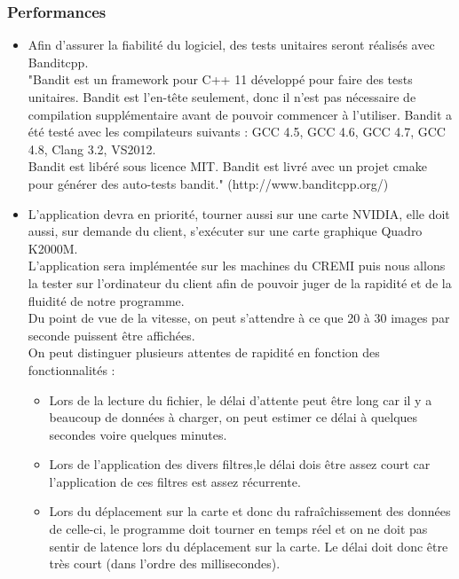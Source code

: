 \documentclass[12pt]{article}
\begin{document}
			\subsubsection{Performances}
				\begin{itemize}
					\item Afin d’assurer la fiabilité du logiciel, des tests unitaires seront réalisés avec Banditcpp.\\
						"Bandit est un framework pour C++ 11 développé pour faire des tests unitaires. Bandit est l’en-tête seulement, donc il n’est pas nécessaire de compilation supplémentaire avant de pouvoir commencer à l’utiliser. Bandit a été testé avec les compilateurs suivants : GCC 4.5, GCC 4.6, GCC 4.7, GCC 4.8, Clang 3.2, VS2012.\\
						Bandit est libéré sous licence MIT. Bandit est livré avec un projet cmake pour générer des auto-tests bandit." (http://www.banditcpp.org/)\\

					\item L'application devra en priorité, tourner aussi sur une carte NVIDIA, elle doit aussi, sur	demande du client, s’exécuter sur une carte graphique Quadro K2000M.\\
						L’application sera implémentée sur les machines du CREMI puis nous allons la tester sur	l’ordinateur du client afin de pouvoir juger de la rapidité et de la fluidité de notre programme.\\
						Du point de vue de la vitesse, on peut s’attendre à ce que 20 à 30 images par seconde puissent être affichées.\\
						On peut distinguer plusieurs attentes de rapidité en fonction des fonctionnalités :
						\begin{itemize}
							\item Lors de la lecture du fichier, le délai d’attente peut être long car il y a beaucoup de données à charger, on peut estimer ce délai à quelques secondes voire quelques minutes.
							\item Lors de l’application des divers filtres,le délai dois être assez court car l’application de ces filtres est assez récurrente.
							\item Lors du déplacement sur la carte et donc du rafraîchissement des données de celle-ci, le programme doit tourner en temps réel et on ne doit pas sentir de latence lors du déplacement sur la carte. Le délai doit donc être très court (dans l’ordre des millisecondes).
						\end{itemize}
					\end{itemize}
\end{document}
